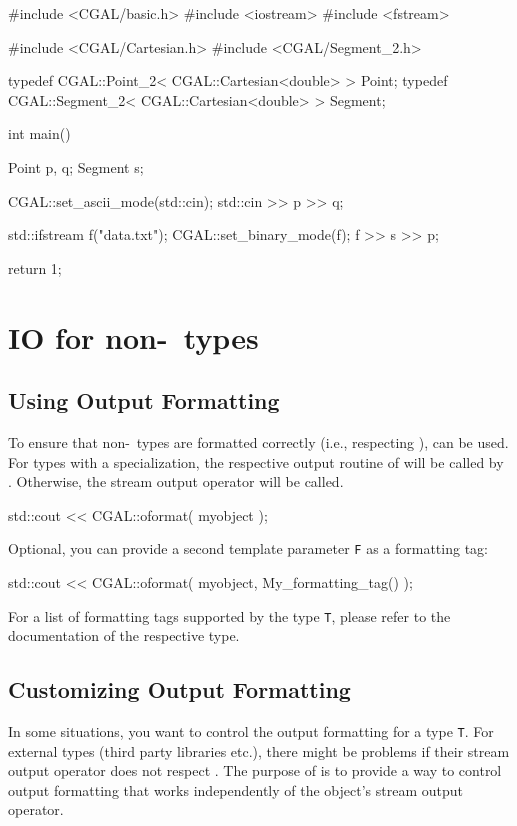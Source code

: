 \begin{ccExampleCode}

#include <CGAL/basic.h>
#include <iostream>
#include <fstream>

#include <CGAL/Cartesian.h>
#include <CGAL/Segment_2.h>

typedef CGAL::Point_2< CGAL::Cartesian<double> >     Point;
typedef CGAL::Segment_2< CGAL::Cartesian<double> >   Segment;

int
main()
{
    Point p, q;
    Segment s;

    CGAL::set_ascii_mode(std::cin);
    std::cin >> p >> q;

    std::ifstream f("data.txt");
    CGAL::set_binary_mode(f);
    f >> s >> p;

    return 1;
}
\end{ccExampleCode}

\section{IO for non-\cgal\ types\label{sec:iofornoncgaltypes}}


\subsection{Using Output Formatting}
To ensure that non-\cgal\ types are formatted correctly (i.e., respecting ),  can be used. For types with a  specialization, the respective output routine of  will be called by . Otherwise, the stream output operator will be called.

\ccExample
\begin{ccExampleCode}
std::cout << CGAL::oformat( myobject );
\end{ccExampleCode}

Optional, you can provide a second template parameter \texttt{F} as a formatting tag:

\ccExample
\begin{ccExampleCode}
std::cout << CGAL::oformat( myobject, My_formatting_tag() );
\end{ccExampleCode}

For a list of formatting tags supported by the type \texttt{T}, please refer to the documentation of the respective type.

\subsection{Customizing Output Formatting}
In some situations, you want to control the output formatting for a type \texttt{T}. For external types (third party libraries etc.), there might be problems if their stream output operator does not respect . The purpose of  is to provide a way to control output formatting that works independently of the object's stream output operator.

